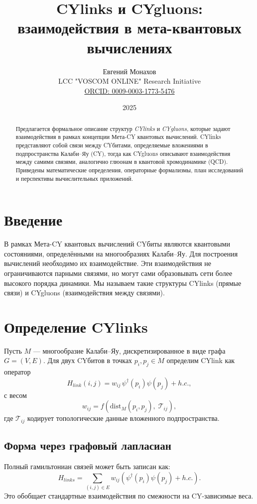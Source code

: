 \documentclass[12pt,a4paper]{article}
\title{CYlinks и CYgluons: взаимодействия в мета-квантовых вычислениях}
\author{Евгений Монахов \\ LCC "VOSCOM ONLINE" Research Initiative \\ 
\href{https://orcid.org/0009-0003-1773-5476}{ORCID: 0009-0003-1773-5476}}
\date{2025}
\begin{document}
\maketitle

\begin{abstract}
Предлагается формальное описание структур \emph{CYlinks} и \emph{CYgluons}, 
которые задают взаимодействия в рамках концепции Мета-CY квантовых вычислений.  
CYlinks представляют собой связи между CYбитами, определяемые вложениями в 
подпространства Калаби--Яу (CY), тогда как CYgluons описывают взаимодействия 
между самими связями, аналогично глюонам в квантовой хромодинамике (QCD).  
Приведены математические определения, операторные формализмы, 
план исследований и перспективы вычислительных приложений.  
\end{abstract}

\section{Введение}
В рамках Мета-CY квантовых вычислений CYбиты являются квантовыми состояниями, определёнными на многообразиях Калаби--Яу.  
Для построения вычислений необходимо их взаимодействие.  
Эти взаимодействия не ограничиваются парными связями, но могут сами образовывать 
сети более высокого порядка динамики.  
Мы называем такие структуры CYlinks (прямые связи) и CYgluons (взаимодействия между связями).  

\section{Определение CYlinks}
Пусть $M$ — многообразие Калаби--Яу, дискретизированное в виде графа $G=(V,E)$.  
Для двух CYбитов в точках $p_i,p_j \in M$ определим CYlink как оператор
\begin{equation}
H_{link}(i,j) = w_{ij} \, \psi^\dagger(p_i)\psi(p_j) + h.c.,
\end{equation}
с весом
\begin{equation}
w_{ij} = f(\mathrm{dist}_M(p_i,p_j), \;\mathcal{T}_{ij}),
\end{equation}
где $\mathcal{T}_{ij}$ кодирует топологические данные вложенного подпространства.

\subsection{Форма через графовый лапласиан}
Полный гамильтониан связей может быть записан как:
\begin{equation}
H_{links} = \sum_{(i,j)\in E} w_{ij} ( \psi^\dagger(p_i)\psi(p_j) + h.c. ).
\end{equation}
Это обобщает стандартные взаимодействия по смежности на CY-зависимые веса.
\end{document}
